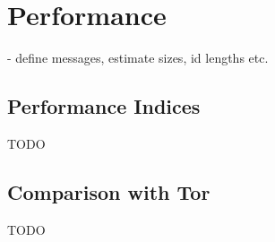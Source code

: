 \chapter{Performance}
- define messages, estimate sizes, id lengths etc.
\section{Performance Indices}
TODO
\section{Comparison with Tor}
TODO
